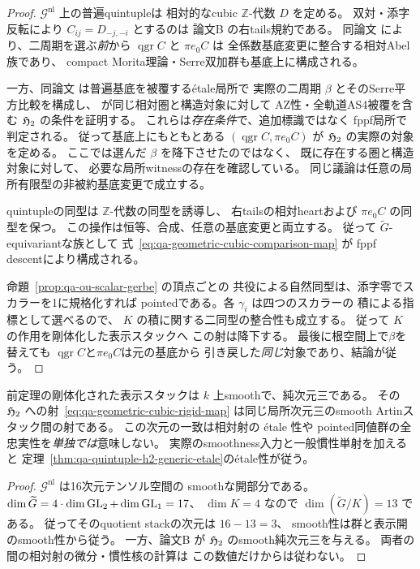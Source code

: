\begin{proof}
$\mathscr G^{\mathrm{nl}}$ 上の普遍quintupleは
相対的なcubic $\mathbb Z$-代数 $D$ を定める。
双対・添字反転により $C_{ij}=D_{-j,-i}$ とするのは
論文B \cite[\texttt{thm:geometric-cubic-relative-effectivity}]{QuadricModuli2026}
の右tails規約である。
同論文 \cite[\texttt{prop:general-cubic-canonical-tails}]{QuadricModuli2026}
により、二周期を選ぶ\emph{前}から
$\operatorname{qgr}C$ と $\pi e_0C$ は
全係数基底変更に整合する相対Abel族であり、
compact Morita理論・Serre双加群も基底上に構成される。

一方、同論文
\cite[\texttt{lem:picard-halves},
\texttt{thm:relative-compatible-root}]{QuadricModuli2026}
は普遍基底を被覆するétale局所で
実際の二周期 $\beta$ とそのSerre平方比較を構成し、
\cite[\texttt{thm:geometric-cubic-relative-effectivity}]{QuadricModuli2026}
が同じ相対圏と構造対象に対して
AZ性・全軌道AS4被覆を含む $\mathfrak H_2$ の条件を証明する。
これらは\emph{存在条件}で、追加標識ではなく
fppf局所で判定される。
従って基底上にもともとある
$(\operatorname{qgr}C,\pi e_0C)$ が
$\mathfrak H_2$ の実際の対象を定める。
ここでは選んだ $\beta$ を降下させたのではなく、
既に存在する圏と構造対象に対して、
必要な局所witnessの存在を確認している。
同じ議論は任意の局所有限型の非被約基底変更で成立する。

quintupleの同型は $\mathbb Z$-代数の同型を誘導し、
右tailsの相対heartおよび $\pi e_0C$ の同型を保つ。
この操作は恒等、合成、任意の基底変更と両立する。
従って $\widetilde G$-equivariantな族として
式~\eqref{eq:qa-geometric-cubic-comparison-map} が
fppf descentにより構成される。

命題~\ref{prop:qa-ou-scalar-gerbe} の頂点ごとの
共役による自然同型は、添字零でスカラーを1に規格化すれば
pointedである。各 $\gamma_i$ は四つのスカラーの
積による指標として選べるので、
$K$ の積に関する二同型の整合性も成立する。
従って $K$ の作用を剛体化した表示スタックへ
この射は降下する。
最後に根空間上で$\beta$を替えても
$\operatorname{qgr}C$と$\pi e_0C$は元の基底から
引き戻した\emph{同じ}対象であり、結論が従う。
\end{proof}

\begin{corollary}
\label{cor:qa-quintuple-rigid-dimension}
前定理の剛体化された表示スタックは
$k$ 上smoothで、純次元三である。
その $\mathfrak H_2$ への射~\eqref{eq:qa-geometric-cubic-rigid-map}
は同じ局所次元三のsmooth Artinスタック間の射である。
この次元の一致は相対射の étale 性や
pointed同値群の全忠実性を\emph{単独では}意味しない。
実際のsmoothness入力と一般慣性単射を加えると
定理~\ref{thm:qa-quintuple-h2-generic-etale}のétale性が従う。
\end{corollary}
\begin{proof}
$\mathscr G^{\mathrm{nl}}$ は16次元テンソル空間の
smoothな開部分である。
$\dim\widetilde G=4\cdot\dim\operatorname{GL}_2+\dim\operatorname{GL}_1=17$、
$\dim K=4$ なので
$\dim(\widetilde G/K)=13$ である。
従ってそのquotient stackの次元は $16-13=3$、
smooth性は群と表示開のsmooth性から従う。
一方、論文B
\cite[\texttt{thm:global-h2-smooth-finite-type}]{QuadricModuli2026}
が $\mathfrak H_2$ のsmooth純次元三を与える。
両者の間の相対射の微分・慣性核の計算は
この数値だけからは従わない。
\end{proof}

